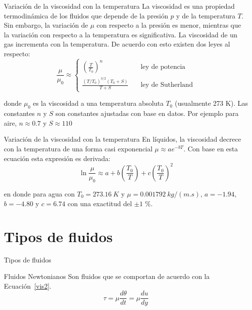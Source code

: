 \documentclass [xcolor=svgnames, t] {beamer}
\begin{document}
\begin{frame}{Variaci\'on de la viscosidad con la temperatura}
La viscosidad es una propiedad termodin\'amica de los fluidos que depende de la presi\'on $p$ y de la temperatura $T$. Sin embargo, la variaci\'on de $\mu$ con respecto a la presi\'on es menor, mientras que la variaci\'on con respecto a la temperatura es significativa.
La viscosidad de un gas incrementa con la temperatura. De acuerdo con esto existen dos leyes al respecto:
\begin{equation}
\frac{\mu}{\mu_0} \approx 
\begin{cases}
\left( \frac{T}{T_0} \right)^n & \quad \text{ley de potencia} \\
\frac{(T/T_0 )^{3/2}(T_0 + S)}{T+S} & \quad \text{ley de Sutherland} 
\end{cases}
\label{vist}
\end{equation}

donde $\mu_0$ es la viscosidad a una temperatura absoluta $T_0$ (usualmente 273 K). Las constantes $n$ y $S$ son constantes ajustadas con base en datos. Por ejemplo para aire, $n\approx 0.7$ y $S\approx 110$ 
\end{frame}

\begin{frame}{Variaci\'on de la viscosidad con la temperatura}
En l\'iquidos, la viscosidad decrece con la temperatura de una forma casi exponencial $\mu \approx ae^{-bT}$. Con base en esta ecuaci\'on esta expresi\'on es derivada:
\begin{equation}
\ln \frac{\mu}{\mu_0} \approx  a + b \left(\frac{T_0}{T}\right)+ c\left(\frac{T_0}{T}\right)^2
\label{visf}
\end{equation}

en donde para agua con $T_0 = 273.16\ K$ y $\mu = 0.001792\ kg/(m.s)$, $a=-1.94$, $b=-4.80$ y $c=6.74$ con una  exactitud del $\pm 1$ \%.
\end{frame}


\section{Tipos de fluidos}
\begin{frame}{Tipos de fluidos}
\begin{block}{Fluidos Newtonianos}
Son fluidos que se comportan de acuerdo con la Ecuaci\'on~\ref{vis2}.
\begin{equation}
\tau = \mu \frac{d \theta}{d t} = \mu \frac{d u}{d y}
\end{equation}

\end{block}
\end{frame}
\end{document}
